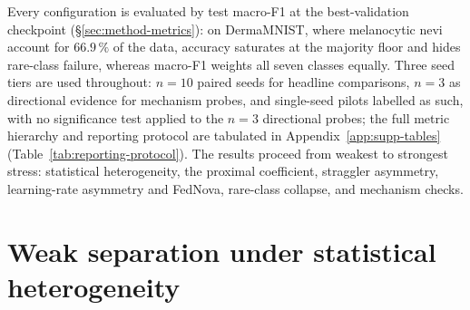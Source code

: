 \documentclass[11pt,a4paper]{report}
\begin{document}


Every configuration is evaluated by test macro-F1 at the best-validation checkpoint
(\S\ref{sec:method-metrics}): on DermaMNIST, where melanocytic nevi account for
$66.9\,\%$ of the data, accuracy saturates at the
majority floor and hides rare-class failure, whereas macro-F1 weights all seven
classes equally. Three seed tiers are used throughout: $n=10$ paired seeds for
headline comparisons, $n=3$ as directional evidence for mechanism probes, and
single-seed pilots labelled as such, with no significance test applied to the
$n=3$ directional probes; the full metric hierarchy and reporting protocol are
tabulated in Appendix~\ref{app:supp-tables} (Table~\ref{tab:reporting-protocol}).
The results proceed from weakest to strongest stress: statistical heterogeneity,
the proximal coefficient, straggler asymmetry, learning-rate asymmetry and FedNova,
rare-class collapse, and mechanism checks.




\section{Weak separation under statistical heterogeneity}
\label{sec:statistical-heterogeneity}
\end{document}
